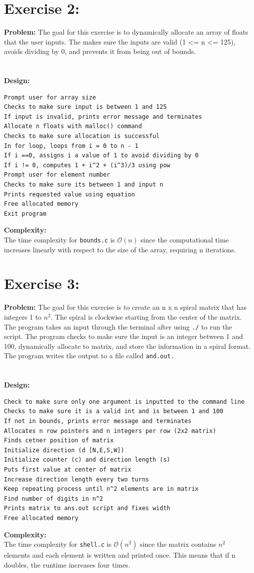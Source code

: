 \documentclass{article}
\begin{document}
\section{Exercise 2:}
\textbf{Problem:} The goal for this exercise is to dynamically allocate an array of floats that the user inputs. The makes sure
the inputs are valid (1 <= n <= 125), avoids dividing by 0, and prevents it from being out of bounds.\\\\\\
\textbf{Design:}
\begin{verbatim}
Prompt user for array size
Checks to make sure input is between 1 and 125
If input is invalid, prints error message and terminates
Allocate n floats with malloc() command
Checks to make sure allocation is successful
In for loop, loops from i = 0 to n - 1
If i ==0, assigns i a value of 1 to avoid dividing by 0
If i != 0, computes 1 + i^2 + (i^3)/3 using pow
Prompt user for element number
Checks to make sure its between 1 and input n
Prints requested value using equation
Free allocated memory
Exit program
\end{verbatim}
\bigskip
\bigskip
\textbf{Complexity:}\\
The time complexity for \texttt{bounds.c} is $\mathcal{O}(n)$ since the computational time increases linearly with respect to the
size of the array, requiring n iterations.
\newpage


\section{Exercise 3:}
\textbf{Problem:} The goal for this exercise is to create an n x n spiral matrix that has integers 1 to $n^2$. The spiral is
clockwise starting from the center of the matrix. The program takes an input through the terminal after using \texttt{./} to
run the script. The program checks to make sure the input is an integer between 1 and 100, dynamically allocate to matrix, and
store the information in a spiral format. The program writes the output to a file called \texttt{and.out.}\\\\\\
\textbf{Design:}
\begin{verbatim}
Check to make sure only one argument is inputted to the command line
Checks to make sure it is a valid int and is between 1 and 100
If not in bounds, prints error message and terminates
Allocates n row pointers and n integers per row (2x2 matrix)
Finds cetner position of matrix
Initialize direction (d [N,E,S,W])
Initialize counter (c) and direction length (s)
Puts first value at center of matrix
Increase direction length every two turns
Keep repeating process until n^2 elements are in matrix
Find number of digits in n^2
Prints matrix to ans.out script and fixes width
Free allocated memory
\end{verbatim}
\bigskip
\bigskip
\textbf{Complexity:}\\
The time complexity for \texttt{shell.c} is $\mathcal{O}(n^2)$ since the matrix contains $n^2$ elements and each element is written and
printed once. This means that if n doubles, the runtime increases four times.
\end{document}
